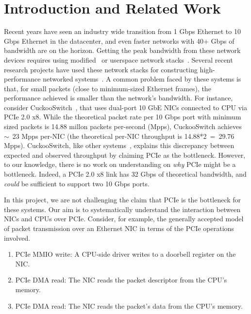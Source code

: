 \section{Introduction and Related Work}
\label{sec:intro}

Recent years have seen an industry wide transition from 1 Gbps Ethernet to
10 Gbps Ethernet in the datacenter, and even faster networks with 40+ Gbps
of bandwidth are on the horizon.  Getting the peak bandwidth from these
network devices requires using modified~\cite{Rizzo2012} or userspace network
stacks~\cite{Han:sigcomm2010, www-dpdk}.  Several recent research projects
have used these network stacks for constructing high-performance networked
systems~\cite{Han:xia-nsdi2012, zhou:conext2013, Lim:nsdi2014}.  A common problem
faced by these systems is that, for small packets (close to minimum-sized
Ethernet frames), the performance achieved is smaller than the network's
bandwidth.  For instance, consider CuckooSwitch~\cite{zhou:conext2013}, that
uses dual-port 10 GbE NICs connected to CPU via PCIe 2.0 x8.  While the
theoretical packet rate per 10 Gbps port with minimum sized packets is
14.88 millon packets per-second (Mpps), CuckooSwitch achieves~$\sim$~23 Mpps
per-NIC (the theoretical per-NIC throughput is 14.88*2~=~29.76 Mpps). CuckooSwitch,
like other systems~\cite{Han:xia-nsdi2012, zhou:conext2013, Lim:nsdi2014},
explains this discrepancy between expected and observed throughput by claiming
PCIe as the bottleneck.  However, to our knowledge, there is no work on
understanding on \emph{why} PCIe might be a bottleneck. Indeed, a PCIe 2.0 x8
link has 32 Gbps of theoretical bandwidth, and \emph{could} be sufficient to
support two 10 Gbps ports.

In this project, we are not challenging the claim that PCIe is the bottleneck
for these systems.  Our aim is to systematically understand the interaction
between NICs and CPUs over PCIe.  Consider, for example, the generally accepted
model of packet transmission over an Ethernet NIC in terms of the PCIe operations
involved.
\begin{enumerate}
\item{PCIe MMIO write:} A CPU-side driver writes to a doorbell register on the NIC.
\item{PCIe DMA read:} The NIC reads the packet descriptor from the CPU's memory.
\item{PCIe DMA read:} The NIC reads the packet's data from the CPU's memory.
\end{enumerate}

